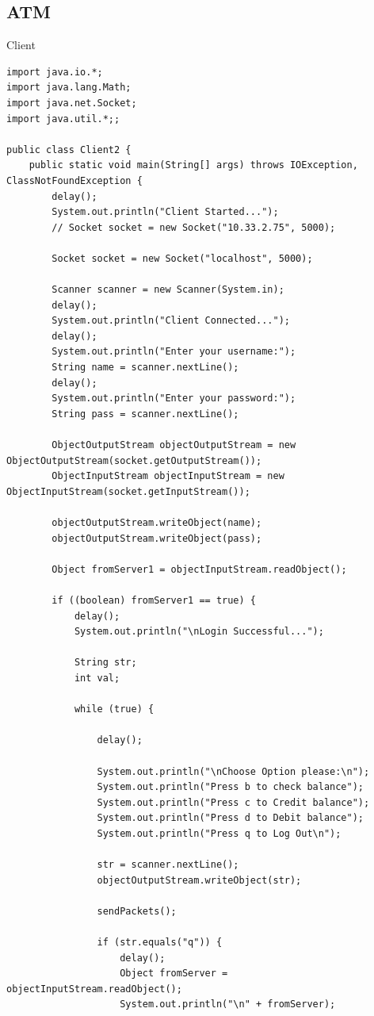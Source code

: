 \documentclass[11pt]{article}
\begin{document}
\subsection{ATM}
Client
\begin{lstlisting}
import java.io.*;
import java.lang.Math;
import java.net.Socket;
import java.util.*;;

public class Client2 {
    public static void main(String[] args) throws IOException, ClassNotFoundException {
        delay();
        System.out.println("Client Started...");
        // Socket socket = new Socket("10.33.2.75", 5000);

        Socket socket = new Socket("localhost", 5000);

        Scanner scanner = new Scanner(System.in);
        delay();
        System.out.println("Client Connected...");
        delay();
        System.out.println("Enter your username:");
        String name = scanner.nextLine();
        delay();
        System.out.println("Enter your password:");
        String pass = scanner.nextLine();

        ObjectOutputStream objectOutputStream = new ObjectOutputStream(socket.getOutputStream());
        ObjectInputStream objectInputStream = new ObjectInputStream(socket.getInputStream());

        objectOutputStream.writeObject(name);
        objectOutputStream.writeObject(pass);

        Object fromServer1 = objectInputStream.readObject();

        if ((boolean) fromServer1 == true) {
            delay();
            System.out.println("\nLogin Successful...");

            String str;
            int val;

            while (true) {

                delay();

                System.out.println("\nChoose Option please:\n");
                System.out.println("Press b to check balance");
                System.out.println("Press c to Credit balance");
                System.out.println("Press d to Debit balance");
                System.out.println("Press q to Log Out\n");

                str = scanner.nextLine();
                objectOutputStream.writeObject(str);

                sendPackets();

                if (str.equals("q")) {
                    delay();
                    Object fromServer = objectInputStream.readObject();
                    System.out.println("\n" + fromServer);


\end{lstlisting}
\end{document}
